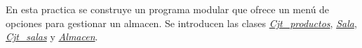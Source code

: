 En esta practica se construye un programa modular que ofrece un menú de opciones para gestionar un almacen. Se introducen las clases {\itshape \hyperlink{class_cjt__productos}{Cjt\+\_\+productos}}, {\itshape \hyperlink{class_sala}{Sala}}, {\itshape \hyperlink{class_cjt__salas}{Cjt\+\_\+salas}} y {\itshape \hyperlink{class_almacen}{Almacen}}. 